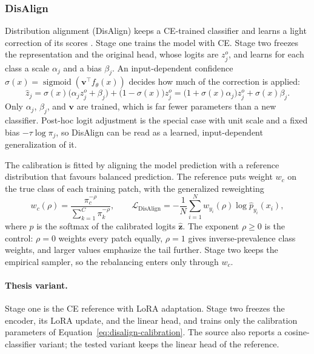 \documentclass[11pt]{article}
\begin{document}
\subsubsection{DisAlign}
Distribution alignment (DisAlign) keeps a CE-trained classifier and learns a light correction of its scores \citep{zhang2021distributionAlignment}. Stage one trains the model with CE. Stage two freezes the representation and the original head, whose logits are $z^{o}_j$, and learns for each class a scale $\alpha_j$ and a bias $\beta_j$. An input-dependent confidence $\sigma(x)=\operatorname{sigmoid}(\mathbf v^{\top}f_\theta(x))$ decides how much of the correction is applied:
\begin{equation}
  \hat z_j=\sigma(x)\bigl(\alpha_j z^{o}_j+\beta_j\bigr)+\bigl(1-\sigma(x)\bigr)z^{o}_j
         =\bigl(1+\sigma(x)\alpha_j\bigr)z^{o}_j+\sigma(x)\beta_j.
  \label{eq:disalign-calibration}
\end{equation}
\noindent Only $\alpha_j$, $\beta_j$, and $\mathbf v$ are trained, which is far fewer parameters than a new classifier. Post-hoc logit adjustment is the special case with unit scale and a fixed bias $-\tau\log\pi_j$, so DisAlign can be read as a learned, input-dependent generalization of it.

The calibration is fitted by aligning the model prediction with a reference distribution that favours balanced prediction. The reference puts weight $w_c$ on the true class of each training patch, with the generalized reweighting
\begin{equation}
  w_c(\rho)=\frac{\pi_c^{-\rho}}{\sum_{k=1}^{C}\pi_k^{-\rho}},
  \qquad
  \mathcal L_{\mathrm{DisAlign}}=-\frac{1}{N}\sum_{i=1}^{N}w_{y_i}(\rho)\log\hat p_{y_i}(x_i),
  \label{eq:disalign-loss}
\end{equation}
\noindent where $\hat p$ is the softmax of the calibrated logits $\hat{\mathbf z}$. The exponent $\rho\geq0$ is the control: $\rho=0$ weights every patch equally, $\rho=1$ gives inverse-prevalence class weights, and larger values emphasize the tail further. Stage two keeps the empirical sampler, so the rebalancing enters only through $w_c$.

\paragraph{Thesis variant.}
Stage one is the CE reference with LoRA adaptation. Stage two freezes the encoder, its LoRA update, and the linear head, and trains only the calibration parameters of Equation~\eqref{eq:disalign-calibration}. The source also reports a cosine-classifier variant; the tested variant keeps the linear head of the reference.
\end{document}
